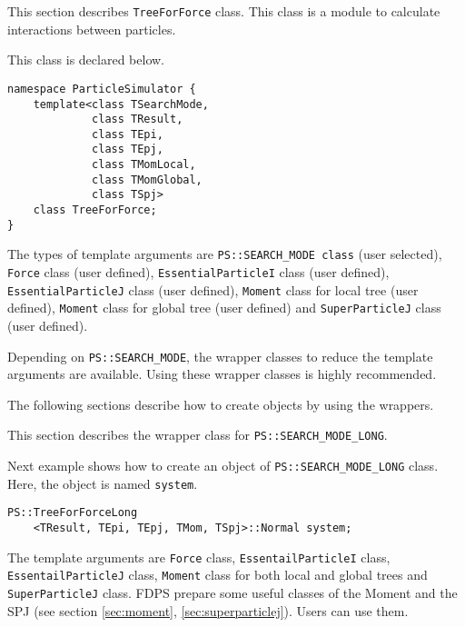 This section describes {\tt TreeForForce} class. This class is a
module to calculate interactions between particles.


This class is declared below.

\begin{lstlisting}[caption=TreeForForce0]
namespace ParticleSimulator {
    template<class TSearchMode,
             class TResult,
             class TEpi,
             class TEpj,
             class TMomLocal,
             class TMomGlobal,
             class TSpj>
    class TreeForForce;
}
\end{lstlisting}

The types of template arguments are {\tt PS::SEARCH\_MODE class} (user selected), {\tt Force} class (user defined), {\tt EssentialParticleI} class (user defined), {\tt EssentialParticleJ} class (user defined), {\tt Moment} class for local tree (user defined), {\tt Moment} class for global tree (user defined) and {\tt SuperParticleJ} class (user defined).

Depending on {\tt PS::SEARCH\_MODE}, the wrapper classes to reduce the template arguments are available. Using these wrapper classes is highly recommended.

The following sections describe how to create objects by using the wrappers.

\label{sec:module_treeforce_standard_search_mode_long}

This section describes the wrapper class for {\tt PS::SEARCH\_MODE\_LONG}.


Next example shows how to create an object of {\tt PS::SEARCH\_MODE\_LONG} class.  Here, the object is named {\tt system}.

\begin{screen}
\begin{verbatim}
PS::TreeForForceLong
    <TResult, TEpi, TEpj, TMom, TSpj>::Normal system;
\end{verbatim}
\end{screen}

The template arguments are {\tt Force} class, {\tt EssentailParticleI} class, {\tt EssentailParticleJ} class, {\tt Moment} class for both local and global trees and {\tt SuperParticleJ} class. FDPS prepare some useful classes of the Moment and the SPJ (see section \ref{sec:moment}, \ref{sec:superparticlej}). Users can use them.

